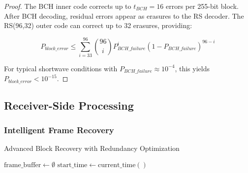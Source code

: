 \documentclass[11pt,a4paper]{article}
\begin{document}
\begin{proof}
The BCH inner code corrects up to $t_{BCH} = 16$ errors per 255-bit block. After BCH decoding, residual errors appear as erasures to the RS decoder. The RS(96,32) outer code can correct up to 32 erasures, providing:

$$P_{block\_error} \leq \sum_{i=33}^{96} \binom{96}{i} P_{BCH\_failure}^i (1-P_{BCH\_failure})^{96-i}$$

For typical shortwave conditions with $P_{BCH\_failure} \approx 10^{-4}$, this yields $P_{block\_error} < 10^{-15}$.
\end{proof}

\subsection{Receiver-Side Processing}

\subsubsection{Intelligent Frame Recovery}

\begin{algorithm}[H]
\SetAlgoLined
{}
\caption{Advanced Block Recovery with Redundancy Optimization}

$\text{frame\_buffer} \leftarrow \emptyset$\;
$\text{start\_time} \leftarrow \text{current\_time}()$\;


\;
\end{algorithm}
\end{document}

